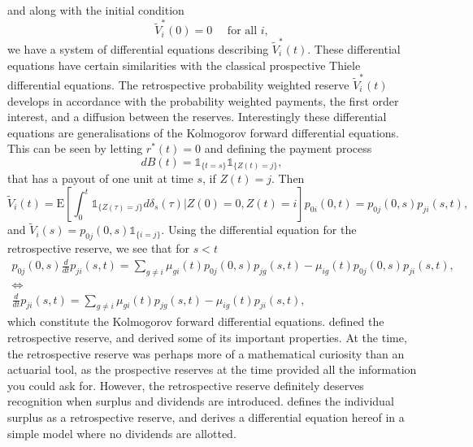 \documentclass[12pt]{article}
\newcommand{\E}{\text{E}}
\newcommand{\indic}[1]{\mathds{1}_{ \{ #1 \} }}
\theoremstyle{my_thm}
\begin{document}
and along with the initial condition
$$
\tilde{V}_i^*(0)=0 \quad \text{ for all } i,
$$
we have a system of differential equations describing $\tilde{V}_i^*(t)$. These differential equations have certain similarities with the classical prospective Thiele differential equations. The retrospective probability weighted reserve $\tilde{V}_i^*(t)$ develops in accordance with the probability weighted payments, the first order interest, and a diffusion between the reserves. Interestingly these differential equations are generalisations of the Kolmogorov forward differential equations. This can be seen by letting $r^*(t)=0$ and defining the payment process
$$
dB(t)=\indic{t=s}\indic{Z(t)=j},
$$
that has a payout of one unit at time $s$, if $Z(t)=j$. Then 
$$
\tilde{V}_i(t)=\E \left[ \int_0^t  \indic{Z(\tau)=j} d\delta_{s}(\tau) |Z(0)=0, Z(t)=i \right] p_{0i}(0,t) = p_{0j}(0,s)p_{ji}(s,t),
$$
and $\tilde{V}_i(s)=p_{0j}(0,s)\indic{i=j}$. Using the differential equation for the retrospective reserve, we see that for $s<t$
\begin{gather*}
p_{0j}(0,s)\frac{d}{dt}p_{ji}(s,t)= \sum_{g\neq i} \mu_{gi}(t)p_{0j}(0,s)p_{jg}(s,t)- \mu_{ig}(t)p_{0j}(0,s)p_{ji}(s,t),
\\
\Leftrightarrow
\\
\frac{d}{dt}p_{ji}(s,t)= \sum_{g\neq i} \mu_{gi}(t)p_{jg}(s,t)- \mu_{ig}(t)p_{ji}(s,t),
\end{gather*}
which constitute the Kolmogorov forward differential equations. \citet{Norberg} defined the retrospective reserve, and derived some of its important properties. At the time, the retrospective reserve was perhaps more of a mathematical curiosity than an actuarial tool, as the prospective reserves at the time provided all the information you could ask for. However, the retrospective reserve definitely deserves recognition when surplus and dividends are introduced. \citet{NorbergB} defines the individual surplus as a retrospective reserve, and derives a differential equation hereof in a simple model where no dividends are allotted.
\end{document}
